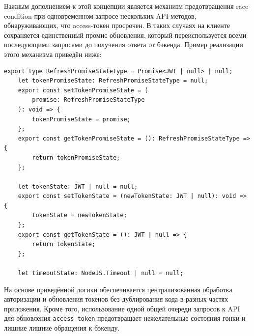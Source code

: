 Важным дополнением к этой концепции является механизм предотвращения race condition при одновременном запросе нескольких API-методов, обнаруживающих, что access-токен просрочен. В таких случаях на клиенте сохраняется единственный промис обновления, который переиспользуется всеми последующими запросами до получения ответа от бэкенда. Пример реализации этого механизма приведён ниже:

\begin{lstlisting}[caption={Механизм предотвращения race condition при рефреше токена}]
	export type RefreshPromiseStateType = Promise<JWT | null> | null;
	let tokenPromiseState: RefreshPromiseStateType = null;
	export const setTokenPromiseState = (
		promise: RefreshPromiseStateType
	): void => {
		tokenPromiseState = promise;
	};
	export const getTokenPromiseState = (): RefreshPromiseStateType => {
		return tokenPromiseState;
	};

	let tokenState: JWT | null = null;
	export const setTokenState = (newTokenState: JWT | null): void => {
		tokenState = newTokenState;
	};
	export const getTokenState = (): JWT | null => {
		return tokenState;
	};

	let timeoutState: NodeJS.Timeout | null = null;
\end{lstlisting}

На основе приведённой логики обеспечивается централизованная обработка авторизации и обновления токенов без дублирования кода в разных частях приложения. Кроме того, использование одной общей очереди запросов к API для обновления \texttt{access\_token} предотвращает нежелательные состояния гонки и лишние лишние обращения к бэкенду.
